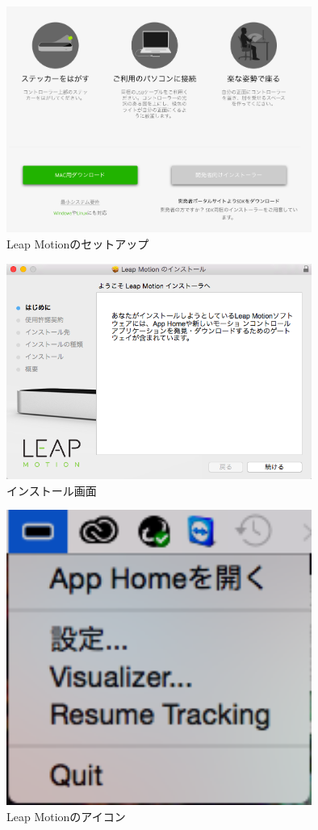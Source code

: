 \documentclass{funthesis}
\begin{document}
\begin{figure}[H]
 \begin{center}
  \includegraphics[width=100mm]{./img/setup.png}
 \end{center}
 \caption{Leap Motionのセットアップ}
 \label{setup}
\end{figure}

\begin{figure}[H]
 \begin{center}
  \includegraphics[width=100mm]{./img/installer.png}
 \end{center}
 \caption{インストール画面}
 \label{install}
\end{figure}

\begin{figure}[H]
 \begin{center}
  \includegraphics[width=100mm]{./img/setting.png}
 \end{center}
 \caption{Leap Motionのアイコン}
 \label{setting}
\end{figure}
\end{document}
